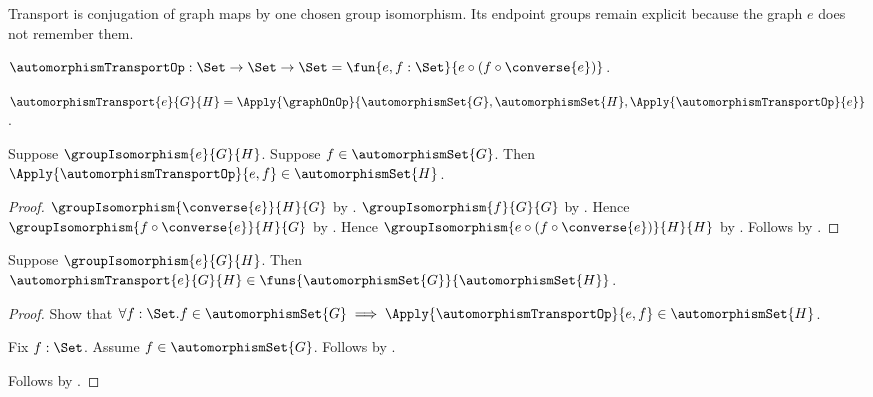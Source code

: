 Transport is conjugation of graph maps by one chosen group isomorphism.  Its
endpoint groups remain explicit because the graph $e$ does not remember them.

\begin{definition}\label{automorphism_transport_op}
    $\automorphismTransportOp:\Set\to\Set\to\Set
        =\fun{e,f:\Set}{
            e\circ(f\circ\converse{e})}$.
\end{definition}

\begin{definition}\label{automorphism_transport}
    $\automorphismTransport{e}{G}{H}=
        \Apply{\graphOnOp}
            {\automorphismSet{G},\automorphismSet{H},\Apply{\automorphismTransportOp}{e}}$.
\end{definition}

\begin{proposition}\label{automorphism_transport_op_closed}
    Suppose $\groupIsomorphism{e}{G}{H}$.
    Suppose $f\in\automorphismSet{G}$.
    Then
        $\Apply{\automorphismTransportOp}{e,f}
            \in\automorphismSet{H}$.
\end{proposition}
\begin{proof}
    $\groupIsomorphism{\converse{e}}{H}{G}$ by
        .
    $\groupIsomorphism{f}{G}{G}$ by
        .
    Hence $\groupIsomorphism{f\circ\converse{e}}{H}{G}$ by
        .
    Hence
        $\groupIsomorphism{e\circ(f\circ\converse{e})}{H}{H}$ by
        .
    Follows by
        .
\end{proof}

\begin{proposition}\label{automorphism_transport_type}
    Suppose $\groupIsomorphism{e}{G}{H}$.
    Then $\automorphismTransport{e}{G}{H}\in
        \funs{\automorphismSet{G}}{\automorphismSet{H}}$.
\end{proposition}
\begin{proof}
    Show that $\forall f:\Set.
        f\in\automorphismSet{G}\implies
        \Apply{\automorphismTransportOp}{e,f}
            \in\automorphismSet{H}$.
    \begin{subproof}
        Fix $f:\Set$.
        Assume $f\in\automorphismSet{G}$.
        Follows by .
    \end{subproof}
    Follows by
        .
\end{proof}

